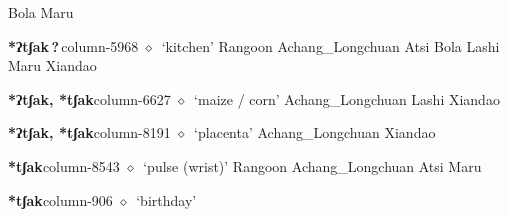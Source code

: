 \hspace{1ex}
         Bola 
\hspace{1ex}
         Maru 
  \item {\footnotesize \textbf{*ʔtʃak\,?\,}}{\tiny column-5968}
         $\diamond$~`kitchen'
         Rangoon 
\hspace{1ex}
         Achang\_Longchuan 
\hspace{1ex}
         Atsi 
\hspace{1ex}
         Bola 
\hspace{1ex}
         Lashi 
\hspace{1ex}
         Maru 
\hspace{1ex}
         Xiandao 
  \item {\footnotesize \textbf{*ʔtʃak, *tʃak}}{\tiny column-6627}
         $\diamond$~`maize / corn'
         Achang\_Longchuan 
\hspace{1ex}
         Lashi 
\hspace{1ex}
         Xiandao 
  \item {\footnotesize \textbf{*ʔtʃak, *tʃak}}{\tiny column-8191}
         $\diamond$~`placenta'
         Achang\_Longchuan 
\hspace{1ex}
         Xiandao 
  \item {\footnotesize \textbf{*tʃak}}{\tiny column-8543}
         $\diamond$~`pulse (wrist)'
         Rangoon 
\hspace{1ex}
         Achang\_Longchuan 
\hspace{1ex}
         Atsi 
\hspace{1ex}
         Maru 
  \item {\footnotesize \textbf{*tʃak}}{\tiny column-906}
         $\diamond$~`birthday'
